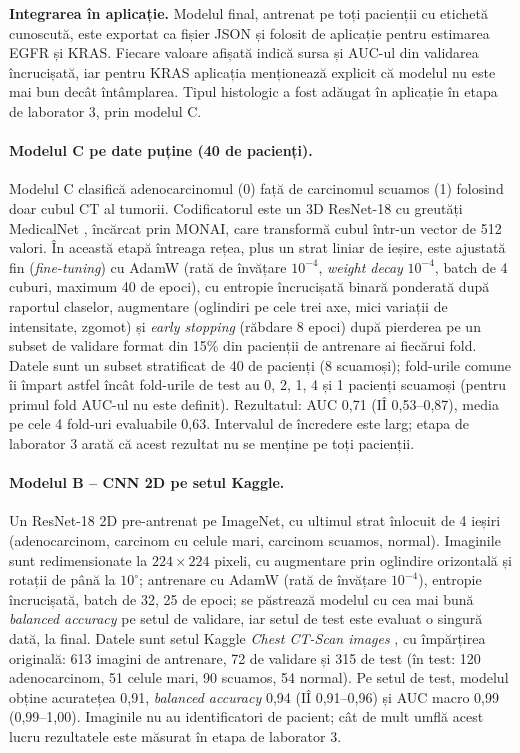 \documentclass[11pt, a4paper]{article}
\begin{document}
\textbf{Integrarea în aplicație.} Modelul final, antrenat pe toți pacienții cu etichetă cunoscută, este exportat ca fișier JSON și folosit de aplicație pentru estimarea EGFR și KRAS. Fiecare valoare afișată indică sursa și AUC-ul din validarea încrucișată, iar pentru KRAS aplicația menționează explicit că modelul nu este mai bun decât întâmplarea. Tipul histologic a fost adăugat în aplicație în etapa de laborator 3, prin modelul C.

\paragraph{Modelul C pe date puține (40 de pacienți).} Modelul C clasifică adenocarcinomul (0) față de carcinomul scuamos (1) folosind doar cubul CT al tumorii. Codificatorul este un 3D ResNet-18 \cite{he2016} cu greutăți MedicalNet \cite{chen2019}, încărcat prin MONAI, care transformă cubul într-un vector de 512 valori. În această etapă întreaga rețea, plus un strat liniar de ieșire, este ajustată fin (\textit{fine-tuning}) cu AdamW (rată de învățare $10^{-4}$, \textit{weight decay} $10^{-4}$, batch de 4 cuburi, maximum 40 de epoci), cu entropie încrucișată binară ponderată după raportul claselor, augmentare (oglindiri pe cele trei axe, mici variații de intensitate, zgomot) și \textit{early stopping} (răbdare 8 epoci) după pierderea pe un subset de validare format din 15\% din pacienții de antrenare ai fiecărui fold. Datele sunt un subset stratificat de 40 de pacienți (8 scuamoși); fold-urile comune îi împart astfel încât fold-urile de test au 0, 2, 1, 4 și 1 pacienți scuamoși (pentru primul fold AUC-ul nu este definit). Rezultatul: AUC 0,71 (IÎ 0,53--0,87), media pe cele 4 fold-uri evaluabile 0,63. Intervalul de încredere este larg; etapa de laborator 3 arată că acest rezultat nu se menține pe toți pacienții.

\paragraph{Modelul B -- CNN 2D pe setul Kaggle.} Un ResNet-18 2D \cite{he2016} pre-antrenat pe ImageNet, cu ultimul strat înlocuit de 4 ieșiri (adenocarcinom, carcinom cu celule mari, carcinom scuamos, normal). Imaginile sunt redimensionate la $224 \times 224$ pixeli, cu augmentare prin oglindire orizontală și rotații de până la $10^\circ$; antrenare cu AdamW (rată de învățare $10^{-4}$), entropie încrucișată, batch de 32, 25 de epoci; se păstrează modelul cu cea mai bună \textit{balanced accuracy} pe setul de validare, iar setul de test este evaluat o singură dată, la final. Datele sunt setul Kaggle \textit{Chest CT-Scan images} \cite{kaggle_ct}, cu împărțirea originală: 613 imagini de antrenare, 72 de validare și 315 de test (în test: 120 adenocarcinom, 51 celule mari, 90 scuamos, 54 normal). Pe setul de test, modelul obține acuratețea 0,91, \textit{balanced accuracy} 0,94 (IÎ 0,91--0,96) și AUC macro 0,99 (0,99--1,00). Imaginile nu au identificatori de pacient; cât de mult umflă acest lucru rezultatele este măsurat în etapa de laborator 3.
\end{document}
